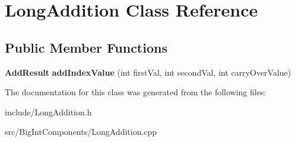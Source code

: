 \section{Long\+Addition Class Reference}
\label{class_long_addition}
\subsection*{Public Member Functions}
\begin{DoxyCompactItemize}
\item 
\mbox{\label{class_long_addition_a2e7e20f55fea668ef9981616a699ffe5}} 
\textbf{ Add\+Result} {\bfseries add\+Index\+Value} (int first\+Val, int second\+Val, int carry\+Over\+Value)
\end{DoxyCompactItemize}


The documentation for this class was generated from the following files\+:\begin{DoxyCompactItemize}
\item 
include/Long\+Addition.\+h\item 
src/\+Big\+Int\+Components/Long\+Addition.\+cpp\end{DoxyCompactItemize}
